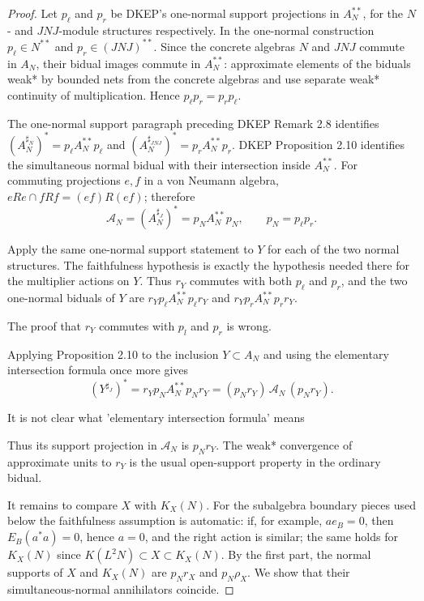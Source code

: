 \documentclass[12pt]{article}
\newcommand{\cA}{\mathcal A}
\newcommand{\review}[1]{\begin{reviewbox}#1\end{reviewbox}}
\begin{document}
\begin{proof}
Let \(p_\ell\) and \(p_r\) be DKEP's one-normal support projections in
\(A_N^{**}\), for the \(N\)- and \(JNJ\)-module structures respectively.  In
the one-normal construction \(p_\ell\in N^{**}\) and
\(p_r\in (JNJ)^{**}\).  Since the concrete algebras \(N\) and \(JNJ\) commute
in \(A_N\), their bidual images commute in \(A_N^{**}\): approximate elements
of the biduals weak* by bounded nets from the concrete algebras and use
separate weak* continuity of multiplication.  Hence \(p_\ell p_r=p_rp_\ell\).

The one-normal support paragraph preceding DKEP Remark 2.8 identifies
\((A_N^{\sharp_N})^*=p_\ell A_N^{**}p_\ell\) and
\((A_N^{\sharp_{JNJ}})^*=p_rA_N^{**}p_r\).  DKEP Proposition 2.10 identifies
the simultaneous normal bidual with their intersection inside \(A_N^{**}\).
For commuting projections \(e,f\) in a von Neumann algebra,
\(eRe\cap fRf=(ef)R(ef)\); therefore
\[
        \cA_N=(A_N^{\sharp_J})^*=p_NA_N^{**}p_N,\qquad
        p_N=p_\ell p_r .                                          \tag{3}
\]

Apply the same one-normal support statement to \(Y\) for each of the two
normal structures.  The faithfulness hypothesis is exactly the hypothesis
needed there for the multiplier actions on \(Y\).  Thus \(r_Y\) commutes with
both \(p_\ell\) and \(p_r\), and the two one-normal biduals of \(Y\) are
\(r_Yp_\ell A_N^{**}p_\ell r_Y\) and \(r_Yp_rA_N^{**}p_rr_Y\).

\review{The proof that $r_Y$ commutes with $p_l$ and $p_r$ is wrong.}

Applying
Proposition 2.10 to the inclusion \(Y\subset A_N\) and using the elementary
intersection formula once more gives
\[
        (Y^{\sharp_J})^*
        = r_Yp_NA_N^{**}p_Nr_Y
        = (p_Nr_Y)\,\cA_N\,(p_Nr_Y).
\]
\review{It is not clear what 'elementary intersection formula' means}
Thus its support projection in \(\cA_N\) is \(p_Nr_Y\).  The weak* convergence
of approximate units to \(r_Y\) is the usual open-support property in the
ordinary bidual.

It remains to compare \(X\) with \(K_X(N)\).  For the subalgebra boundary
pieces used below the faithfulness assumption is automatic: if, for example,
\(a e_B=0\), then \(E_B(a^*a)=0\), hence \(a=0\), and the right action is
similar; the same holds for \(K_X(N)\) since \(K(L^2N)\subset X\subset K_X(N)\).
By the first part, the normal supports of \(X\) and \(K_X(N)\) are \(p_Nr_X\)
and \(p_N\rho_X\).  We show that their simultaneous-normal annihilators
coincide.


\end{proof}
\end{document}
